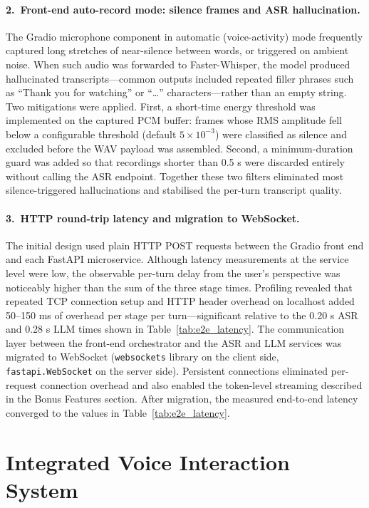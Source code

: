 \documentclass[12pt, a4paper]{article}
\begin{document}
\paragraph{2.\ Front-end auto-record mode: silence frames and ASR hallucination.}
The Gradio microphone component in automatic (voice-activity) mode frequently captured long stretches of near-silence between words, or triggered on ambient noise. When such audio was forwarded to Faster-Whisper, the model produced hallucinated transcripts---common outputs included repeated filler phrases such as ``Thank you for watching'' or ``\ldots'' characters---rather than an empty string. Two mitigations were applied. First, a short-time energy threshold was implemented on the captured PCM buffer: frames whose RMS amplitude fell below a configurable threshold (default $5\times10^{-3}$) were classified as silence and excluded before the WAV payload was assembled. Second, a minimum-duration guard was added so that recordings shorter than 0.5 s were discarded entirely without calling the ASR endpoint. Together these two filters eliminated most silence-triggered hallucinations and stabilised the per-turn transcript quality.

\paragraph{3.\ HTTP round-trip latency and migration to WebSocket.}
The initial design used plain HTTP POST requests between the Gradio front end and each FastAPI microservice. Although latency measurements at the service level were low, the observable per-turn delay from the user's perspective was noticeably higher than the sum of the three stage times. Profiling revealed that repeated TCP connection setup and HTTP header overhead on localhost added 50--150 ms of overhead per stage per turn---significant relative to the 0.20 s ASR and 0.28 s LLM times shown in Table~\ref{tab:e2e_latency}. The communication layer between the front-end orchestrator and the ASR and LLM services was migrated to WebSocket (\texttt{websockets} library on the client side, \texttt{fastapi.WebSocket} on the server side). Persistent connections eliminated per-request connection overhead and also enabled the token-level streaming described in the Bonus Features section. After migration, the measured end-to-end latency converged to the values in Table~\ref{tab:e2e_latency}.


\section{Integrated Voice Interaction System}
\end{document}
